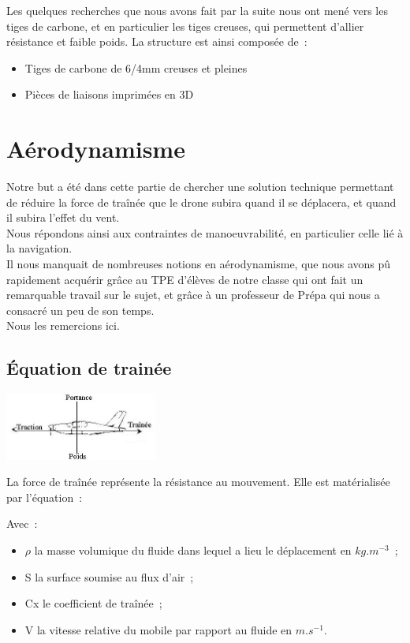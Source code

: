\documentclass[a4paper,11pt]{article}
\begin{document}
Les quelques recherches que nous avons fait par la suite nous ont mené vers les tiges de carbone, et en particulier les tiges creuses, qui permettent d'allier résistance et faible poids.
La structure est ainsi composée de~:
\begin{itemize}
        \item Tiges de carbone de 6/4mm creuses et pleines
        \item Pièces de liaisons imprimées en 3D
\end{itemize}

\section{Aérodynamisme}
	Notre but a été dans cette partie de chercher une solution technique permettant de réduire la force de traînée que le drone subira quand il se déplacera, et quand il subira l'effet du vent. \\
	Nous répondons ainsi aux contraintes de manoeuvrabilité, en particulier celle lié à la navigation.\\
	Il nous manquait de nombreuses notions en aérodynamisme, que nous avons pû rapidement acquérir grâce au TPE d'élèves de notre classe qui ont fait un remarquable travail sur le sujet, et grâce à un professeur de Prépa qui nous a consacré un peu de son temps.\\
	Nous les remercions ici.
\subsection{Équation de trainée}
	\begin{center}
		\includegraphics[width=5cm]{../Images/portance.jpg}
	\end{center}
	La force de traînée représente la résistance au mouvement. Elle est matérialisée par l'équation~:\\
  \begin{center}
  \end{center}
  Avec~:
  \begin{itemize}
   \item $\rho$ la masse volumique du fluide dans lequel a lieu le déplacement en $kg.m^{-3}$~;
   \item S la surface soumise au flux d'air~;
   \item Cx le coefficient de traînée~;
   \item V la vitesse relative du mobile par rapport au fluide en $m.s^{-1}$.
  \end{itemize}
\end{document}
